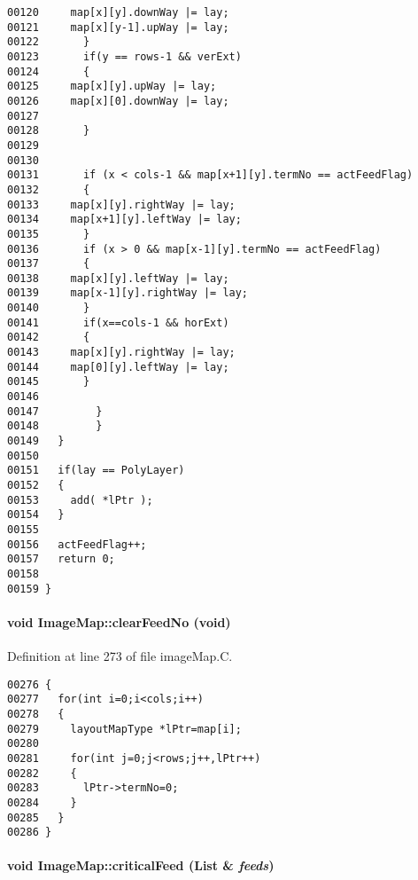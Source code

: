 \begin{verbatim}
00120     map[x][y].downWay |= lay;
00121     map[x][y-1].upWay |= lay;
00122       }
00123       if(y == rows-1 && verExt)  
00124       {
00125     map[x][y].upWay |= lay;
00126     map[x][0].downWay |= lay;
00127     
00128       }
00129 
00130 
00131       if (x < cols-1 && map[x+1][y].termNo == actFeedFlag)
00132       {
00133     map[x][y].rightWay |= lay;
00134     map[x+1][y].leftWay |= lay;
00135       }
00136       if (x > 0 && map[x-1][y].termNo == actFeedFlag)
00137       {
00138     map[x][y].leftWay |= lay;
00139     map[x-1][y].rightWay |= lay;
00140       }
00141       if(x==cols-1 && horExt)  
00142       {
00143     map[x][y].rightWay |= lay;
00144     map[0][y].leftWay |= lay;
00145       }
00146 
00147         }
00148         }
00149   }
00150 
00151   if(lay == PolyLayer)
00152   {
00153     add( *lPtr );
00154   }
00155   
00156   actFeedFlag++;
00157   return 0;
00158 
00159 }
\end{verbatim}\normalsize 
\label{ImageMap_a7}
\paragraph{\setlength{\rightskip}{0pt plus 5cm}void Image\-Map::clear\-Feed\-No (void)}\hfill



Definition at line 273 of file image\-Map.C.\small\begin{verbatim}00276 {
00277   for(int i=0;i<cols;i++)
00278   {
00279     layoutMapType *lPtr=map[i];
00280     
00281     for(int j=0;j<rows;j++,lPtr++)
00282     {
00283       lPtr->termNo=0;
00284     }
00285   }
00286 }
\end{verbatim}\normalsize 
\label{ImageMap_a6}
\paragraph{\setlength{\rightskip}{0pt plus 5cm}void Image\-Map::critical\-Feed ({\bf List} \& {\em feeds})}\hfill



